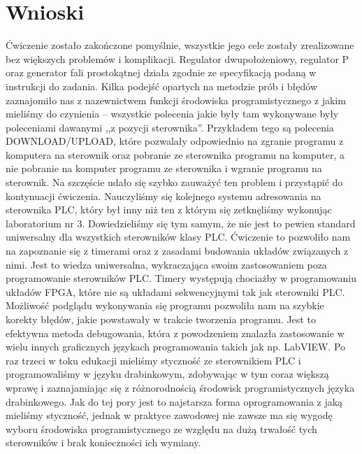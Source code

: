 \documentclass[a4paper, 12pt]{article}
\begin{document}
	\section{Wnioski}
		Ćwiczenie zostało zakończone pomyślnie, wszystkie jego cele zostały zrealizowane bez większych problemów i komplikacji. Regulator dwupołożeniowy, regulator P oraz generator fali prostokątnej działa zgodnie ze specyfikacją podaną w instrukcji do zadania.
		\newline
		\newline
		Kilka podejść opartych na metodzie prób i błędów zaznajomiło nas z nazewnictwem funkcji środowiska programistycznego z jakim mieliśmy do czynienia -- wszystkie polecenia jakie były tam wykonywane były poleceniami dawanymi ,,z pozycji sterownika''. Przykładem tego są polecenia DOWNLOAD/UPLOAD, które pozwalały odpowiednio na zgranie programu z komputera na sterownik oraz pobranie ze sterownika programu na komputer, a nie pobranie na komputer programu ze sterownika i wgranie programu na sterownik. Na szczęście udało się szybko zauważyć ten problem i przystąpić do kontynuacji ćwiczenia.
		\newline
		\newline
		Nauczyliśmy się kolejnego systemu adresowania na sterownika PLC, który był inny niż ten z którym się zetknęliśmy wykonując laboratorium nr 3. Dowiedzieliśmy się tym samym, że nie jest to pewien standard uniwersalny dla wszystkich sterowników klasy PLC.
		\newline
		\newline 
		Ćwiczenie to pozwoliło nam na zapoznanie się z timerami oraz z zasadami budowania układów związanych z nimi. Jest to wiedza uniwersalna, wykraczająca swoim zastosowaniem poza programowanie sterowników PLC. Timery występują chociażby w programowaniu układów FPGA, które nie są układami sekwencyjnymi tak jak sterowniki PLC. 
		\newline
		\newline
		Możliwość podglądu wykonywania się programu pozwoliła nam na szybkie korekty błędów, jakie powstawały w trakcie tworzenia programu. Jest to efektywna metoda debugowania, która z powodzeniem znalazła zastosowanie w wielu innych graficznych językach programowania takich jak np. LabVIEW.
		\newline 
		\newline
		Po raz trzeci w toku edukacji mieliśmy styczność ze sterownikiem PLC i programowaliśmy w języku drabinkowym, zdobywając w tym coraz większą wprawę i zaznajamiając się z różnorodnością środowisk programistycznych języka drabinkowego. Jak do tej pory jest to najstarsza forma oprogramowania z jaką mieliśmy styczność, jednak w praktyce zawodowej nie zawsze ma się wygodę wyboru środowiska programistycznego ze względu na dużą trwałość tych sterowników i brak konieczności ich wymiany.
\end{document}

